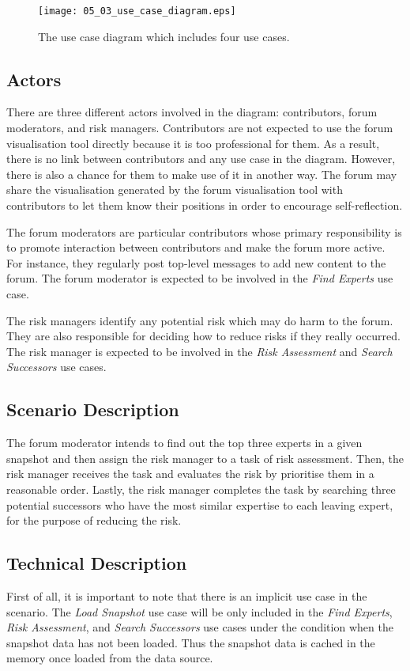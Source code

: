 \begin{figure}[!htb]
  \centering
  \texttt{[image: 05\_03\_use\_case\_diagram.eps]}
  \caption{The use case diagram which includes four use cases.}
  \label{Figure:05_03}
\end{figure}

\subsection{Actors}
There are three different actors involved in the diagram: contributors, forum moderators, and risk managers. Contributors are not expected to use the forum visualisation tool directly because it is too professional for them. As a result, there is no link between contributors and any use case in the diagram. However, there is also a chance for them to make use of it in another way. The forum may share the visualisation generated by the forum visualisation tool with contributors to let them know their positions in order to encourage self-reflection.

The forum moderators are particular contributors whose primary responsibility is to promote interaction between contributors and make the forum more active. For instance, they regularly post top-level messages to add new content to the forum. The forum moderator is expected to be involved in the \emph{Find Experts} use case.

The risk managers identify any potential risk which may do harm to the forum. They are also responsible for deciding how to reduce risks if they really occurred. The risk manager is expected to be involved in the \emph{Risk Assessment} and \emph{Search Successors} use cases.

\subsection{Scenario Description}
The forum moderator intends to find out the top three experts in a given snapshot and then assign the risk manager to a task of risk assessment. Then, the risk manager receives the task and evaluates the risk by prioritise them in a reasonable order. Lastly, the risk manager completes the task by searching three potential successors who have the most similar expertise to each leaving expert, for the purpose of reducing the risk.

\subsection{Technical Description} \label{sec:tech_desc}
First of all, it is important to note that there is an implicit use case in the scenario. The \emph{Load Snapshot} use case will be only included in the \emph{Find Experts}, \emph{Risk Assessment}, and \emph{Search Successors} use cases under the condition when the snapshot data has not been loaded. Thus the snapshot data is cached in the memory once loaded from the data source.

